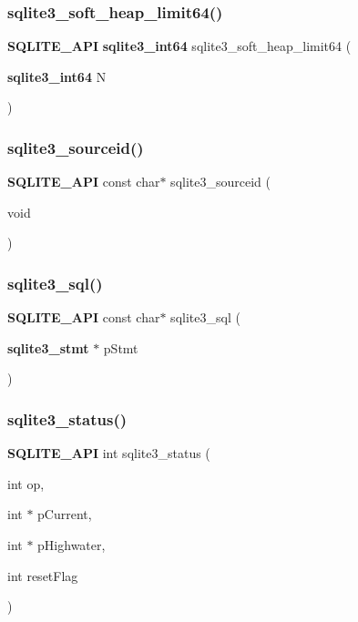 \mbox{\label{sqlite3_8h_ab37b3a4d1652e3acb2c43d1252e6b852}} 
\subsubsection{sqlite3\_soft\_heap\_limit64()}
{\footnotesize\ttfamily \textbf{ S\+Q\+L\+I\+T\+E\+\_\+\+A\+PI} \textbf{ sqlite3\+\_\+int64} sqlite3\+\_\+soft\+\_\+heap\+\_\+limit64 (\begin{DoxyParamCaption}\item[{\textbf{ sqlite3\+\_\+int64}}]{N }\end{DoxyParamCaption})}

\mbox{\label{sqlite3_8h_a6c07a05872503f65a81329abc22244ee}} 
\subsubsection{sqlite3\_sourceid()}
{\footnotesize\ttfamily \textbf{ S\+Q\+L\+I\+T\+E\+\_\+\+A\+PI} const char$\ast$ sqlite3\+\_\+sourceid (\begin{DoxyParamCaption}\item[{void}]{ }\end{DoxyParamCaption})}

\mbox{\label{sqlite3_8h_a918a26294b2d2aff0336119e8b07f8b0}} 
\subsubsection{sqlite3\_sql()}
{\footnotesize\ttfamily \textbf{ S\+Q\+L\+I\+T\+E\+\_\+\+A\+PI} const char$\ast$ sqlite3\+\_\+sql (\begin{DoxyParamCaption}\item[{\textbf{ sqlite3\+\_\+stmt} $\ast$}]{p\+Stmt }\end{DoxyParamCaption})}

\mbox{\label{sqlite3_8h_ac74c51c2111f457b2cd463f0bdf88f86}} 
\subsubsection{sqlite3\_status()}
{\footnotesize\ttfamily \textbf{ S\+Q\+L\+I\+T\+E\+\_\+\+A\+PI} int sqlite3\+\_\+status (\begin{DoxyParamCaption}\item[{int}]{op,  }\item[{int $\ast$}]{p\+Current,  }\item[{int $\ast$}]{p\+Highwater,  }\item[{int}]{reset\+Flag }\end{DoxyParamCaption})}

